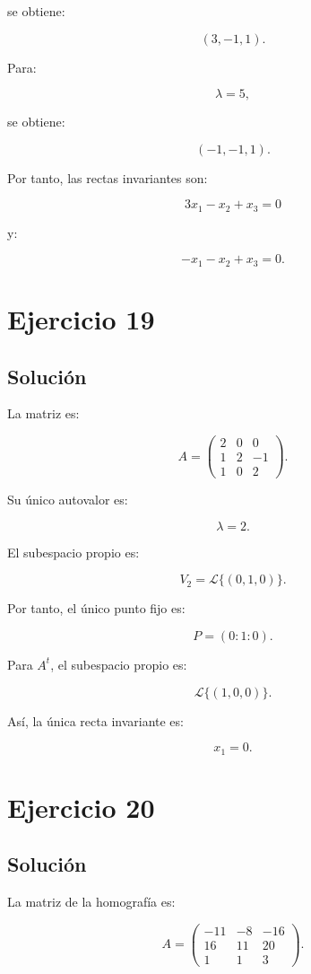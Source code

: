 \documentclass[11pt,a4paper]{article}
\begin{document}
se obtiene:

\[
(3,-1,1).
\]

Para:

\[
\lambda=5,
\]

se obtiene:

\[
(-1,-1,1).
\]

Por tanto, las rectas invariantes son:

\[
\boxed{
3x_1-x_2+x_3=0
}
\]

y:

\[
\boxed{
-x_1-x_2+x_3=0.
}
\]

\section{Ejercicio 19}
\subsection{Solución}

La matriz es:

\[
A=
\begin{pmatrix}
2&0&0\\
1&2&-1\\
1&0&2
\end{pmatrix}.
\]

Su único autovalor es:

\[
\lambda=2.
\]

El subespacio propio es:

\[
V_2=\mathcal L\{(0,1,0)\}.
\]

Por tanto, el único punto fijo es:

\[
\boxed{
P=(0:1:0).
}
\]

Para \(A^t\), el subespacio propio es:

\[
\mathcal L\{(1,0,0)\}.
\]

Así, la única recta invariante es:

\[
\boxed{
x_1=0.
}
\]

\section{Ejercicio 20}
\subsection{Solución}

La matriz de la homografía es:

\[
A=
\begin{pmatrix}
-11&-8&-16\\
16&11&20\\
1&1&3
\end{pmatrix}.
\]
\end{document}
